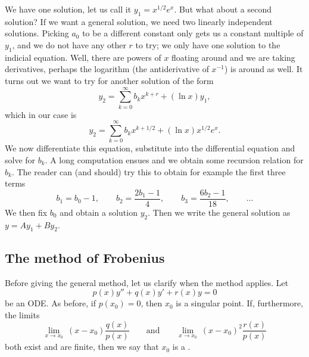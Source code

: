 \documentclass{ximera}
\begin{document}
\begin{exampleSol}
    We have one solution, let us call it $y_1 = x^{1/2} e^x$. But what about a second solution?  If we want a general solution, we need two linearly independent solutions. Picking $a_0$ to be a different constant only gets us a constant multiple of $y_1$, and we do not have any other $r$ to try; we only have one solution to the indicial equation.  Well, there are powers of $x$ floating around and we are taking derivatives, perhaps the logarithm (the antiderivative of $x^{-1}$) is around as well.  It turns out we want to try for another solution of the form
    \begin{equation*}
        y_2 = \sum_{k=0}^\infty b_k x^{k+r} + (\ln x) y_1 ,
    \end{equation*}
    which in our case is
    \begin{equation*}
        y_2 = \sum_{k=0}^\infty b_k x^{k+1/2} + (\ln x) x^{1/2} e^x .
    \end{equation*}
    We now differentiate this equation, substitute into the differential equation and solve for $b_k$.  A long computation ensues and we obtain some recursion relation for $b_k$.  The reader can (and should) try this to obtain for example the first three terms
    \begin{equation*}
    b_1 = b_0 -1 , \qquad b_2 = \frac{2b_1-1}{4} , \qquad b_3 = \frac{6b_2-1}{18} , \qquad \ldots
    \end{equation*}
    We then fix $b_0$ and obtain a solution $y_2$.  Then we write the general solution as $y = A y_1 + B y_2$.
\end{exampleSol}

\subsection{The method of Frobenius}

Before giving the general method, let us clarify when the method applies. Let
\begin{equation*}
    p(x) y'' + q(x) y' + r(x) y = 0
\end{equation*}
be an ODE\@.  As before, if $p(x_0) = 0$, then $x_0$ is a singular point.  If, furthermore, the limits
\begin{equation*}
    \lim_{x \to x_0} ~ (x-x_0) \frac{q(x)}{p(x)} \qquad \text{and} \qquad \lim_{x \to x_0} ~ (x-x_0)^2 \frac{r(x)}{p(x)}
\end{equation*}
both exist and are finite, then we say that $x_0$ is a \emph{}.
\end{document}
